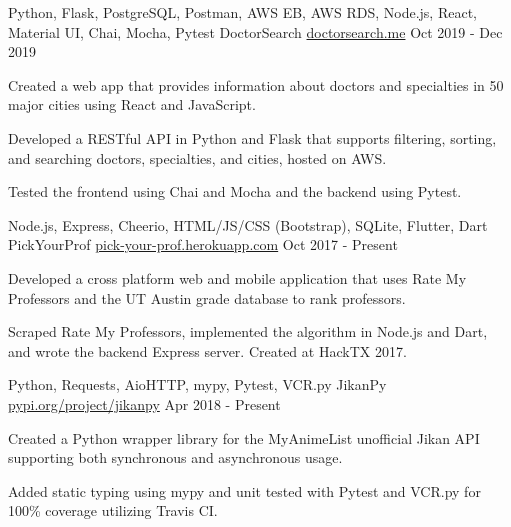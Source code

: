 

\begin{cventries}

  \cventry
  {Python, Flask, PostgreSQL, Postman, AWS EB, AWS RDS, Node.js, React, Material UI, Chai, Mocha, Pytest} %
  {DoctorSearch} %
  {\href{https://doctorsearch.me}{doctorsearch.me}} %
  {Oct 2019 - Dec 2019} %
  {
    \begin{cvitems} %
      \item {Created a web app that provides information about doctors and specialties in 50 major cities using React and JavaScript.}
      \item {Developed a RESTful API in Python and Flask that supports filtering, sorting, and searching doctors, specialties, and cities, hosted on AWS.}
      \item {Tested the frontend using Chai and Mocha and the backend using Pytest.}
    \end{cvitems}
  }

  \cventry
  {Node.js, Express, Cheerio, HTML/JS/CSS (Bootstrap), SQLite, Flutter, Dart} %
  {PickYourProf} %
  {\href{https://pick-your-prof.herokuapp.com/}{pick-your-prof.herokuapp.com}} %
  {Oct 2017 - Present} %
  {
    \begin{cvitems} %
      \item {Developed a cross platform web and mobile application that uses Rate My Professors and the UT Austin grade database to rank professors.}
      \item {Scraped Rate My Professors, implemented the algorithm in Node.js and Dart, and wrote the backend Express server. Created at HackTX 2017.}
    \end{cvitems}
  }

  \cventry
  {Python, Requests, AioHTTP, mypy, Pytest, VCR.py} %
  {JikanPy} %
  {\href{https://pypi.org/project/jikanpy/}{pypi.org/project/jikanpy}} %
  {Apr 2018 - Present} %
  {
    \begin{cvitems} %
      \item {Created a Python wrapper library for the MyAnimeList unofficial Jikan API supporting both synchronous and asynchronous usage.}
      \item {Added static typing using mypy and unit tested with Pytest and VCR.py for 100\% coverage utilizing Travis CI.}
    \end{cvitems}
  }

\end{cventries}
